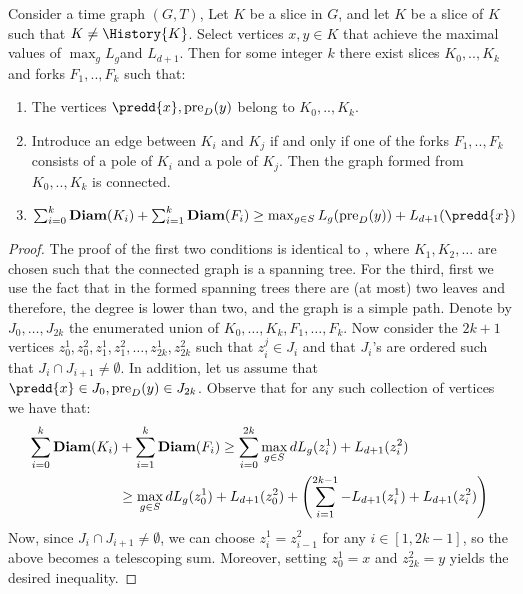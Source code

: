 \begin{claim} 
    \label{claim:prevslicesdiam}
    Consider a time graph $(G,T)$, Let $K$ be a slice in $G$, and let $K$ be a slice of $K$ such that $K \neq \History{K}$. Select vertices $x, y \in K$ that achieve the maximal values of $\max_{g}L_{g}$and $L_{d+1}$.  Then for some integer $k$ there exist slices $K_{0} , ..,K_{k}$ and forks $F_{1},..,F_{k}$ such that:
    \begin{enumerate}
      \item  The vertices $ \predd{x}, \pred{y} $ belong to $K_{0},..,K_{k}$.  
      \item Introduce an edge between $K_{i}$ and $K_{j}$ if and only if one of the forks $F_{1},..,F_{k}$ consists of a pole of $K_{i}$ and a pole of $K_{j}$. Then the graph formed from $K_{0},..,K_{k}$ is connected.  
      \item $\sum_{i=0}^{k}\diam{K_{i}} +  \sum^{k}_{i=1}\diam{F_{i}} \ge \max_{g\in S}L_{g}( \pred{y} ) +  L_{d+1}( \predd{x} )  $
    \end{enumerate}
  \end{claim}
  \begin{proof}
The proof of the first two conditions is identical to , where $K_{1}, K_{2}, \ldots$ are chosen such that the connected graph is a spanning tree. For the third, first we use the fact that in the formed spanning trees there are (at most) two leaves and therefore, the degree is lower than two, and the graph is a simple path. Denote by $J_{0}, \ldots, J_{2k}$ the enumerated union of $K_{0}, \ldots, K_{k}, F_{1}, \ldots, F_{k}$. Now consider the $2k+1$ vertices $z_{0}^{1}, z_{0}^{2}, z_{1}^{1}, z_{1}^{2}, \ldots, z_{2k}^{1}, z_{2k}^{2}$ such that $z_{i}^{j} \in J_{i}$ and that $J_{i}$'s are ordered such that $J_{i} \cap J_{i+1} \neq \emptyset$. In addition, let us assume that $\predd{x} \in J_{0}, \pred{y} \in J_{2k}$. Observe that for any such collection of vertices we have that:
    \begin{equation*}
      \begin{split}
        \sum_{i=0}^{k}\textbf{Diam}(K_{i}) & +  \sum^{k}_{i=1}\textbf{Diam}(F_{i})  \ge \sum_{i=0}^{2k} \max_{g\in S}d L_{g}( z_{i}^{1} ) +  L_{d+1}( z_{i}^{2} )  \\
      & \ge  \max_{g\in S}d L_{g}( z_{0}^{1} ) +  L_{d+1}( z_{0}^{2} )  +  \left( \sum_{i=1}^{2k-1} - L_{d+1}( z_{i}^{1} ) + L_{d+1}( z_{i}^{2} )   \right)  
      \end{split}
    \end{equation*}
    Now, since $ J_{i} \cap J_{i+1} \neq \emptyset $, we can choose $ z_{i}^{1} = z_{i-1}^{2} $ for any $ i \in [1,2k-1] $, so the above becomes a telescoping sum. Moreover, setting $ z_{0}^{1} = x $ and $ z_{2k}^{2} = y $ yields the desired inequality.
  \end{proof}




